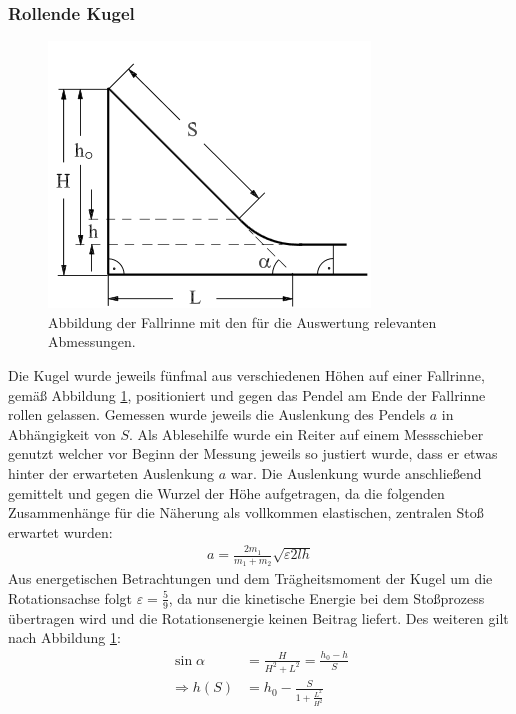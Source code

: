 \subsubsection*{Rollende Kugel}

\begin{figure}[h]
	\centering
	\includegraphics[width=0.7\linewidth]{res/FallrinneSkizze}
	\caption{Abbildung der Fallrinne mit den für die Auswertung relevanten Abmessungen\cite{anleitung-ws2017}.}
	\label{fig:rinneskizze}
\end{figure}


Die Kugel wurde jeweils fünfmal aus verschiedenen Höhen auf einer Fallrinne, gemäß Abbildung \ref{fig:rinneskizze}, positioniert und gegen das Pendel am Ende der Fallrinne rollen gelassen. Gemessen wurde jeweils die Auslenkung des Pendels $a$ in Abhängigkeit von $S$. Als Ablesehilfe wurde ein Reiter auf einem Messschieber genutzt welcher vor Beginn der Messung jeweils so justiert wurde, dass er etwas hinter der erwarteten Auslenkung $a$ war.
Die Auslenkung wurde anschließend gemittelt und gegen die Wurzel der Höhe aufgetragen, da die folgenden Zusammenhänge für die Näherung als vollkommen elastischen, zentralen Stoß erwartet wurden:
\begin{align}
a=\frac{2m_1}{m_1+m_2}\sqrt{\varepsilon 2 l h} \label{eq:alenkrinne}
\end{align}
Aus energetischen Betrachtungen und dem Trägheitsmoment der Kugel um die Rotationsachse folgt $\varepsilon=\frac{5}{9}$, da nur die kinetische Energie  bei dem Stoßprozess übertragen wird und die Rotationsenergie keinen Beitrag liefert.
Des weiteren gilt nach Abbildung \ref{fig:rinneskizze}:
\begin{align}
\sin \alpha &=\frac{H}{H^2+L^2}=\frac{h_0-h}{S} \\
\Rightarrow  h(S) &= h_0-\frac{S}{1+\frac{L^2}{H^2}}
\end{align}













